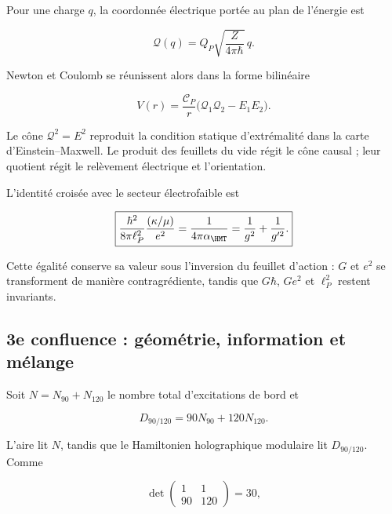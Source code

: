 Pour une charge \(q\), la coordonnée électrique portée au plan de l’énergie est

\begin{equation}
 \mathcal Q(q)=Q_P\sqrt{\frac{Z}{4\pi\hbar}}\,q.
 \label{rm:eq:confluence-electric-coordinate}
\end{equation}

Newton et Coulomb se réunissent alors dans la forme bilinéaire

\begin{equation}
 \boxed{
 V(r)=\frac{\mathscr C_P}{r}
 \bigl(\mathcal Q_1\mathcal Q_2-E_1E_2\bigr).}
 \label{rm:eq:confluence-newton-coulomb}
\end{equation}

Le cône \(\mathcal Q^2=E^2\) reproduit la condition statique d’extrémalité dans la carte d’Einstein--Maxwell. Le produit des feuillets du vide régit le cône causal ; leur quotient régit le relèvement électrique et l’orientation.

L’identité croisée avec le secteur électrofaible est

\begin{equation}
 \boxed{
 \frac{\hbar^2}{8\pi\ell_P^2}
 \frac{(\kappa/\mu)}{e^2}
 =\frac1{4\pi\alpha_{\HMT}}
 =\frac1{g^2}+\frac1{g'^2}.}
 \label{rm:eq:confluence-einstein-maxwell-ew}
\end{equation}

Cette égalité conserve sa valeur sous l’inversion du feuillet d’action : \(G\) et \(e^2\) se transforment de manière contragrédiente, tandis que \(G\hbar\), \(Ge^2\) et \(\ell_P^2\) restent invariants.

\subsection{3e confluence : géométrie, information et mélange}

Soit \(N=N_{90}+N_{120}\) le nombre total d’excitations de bord et

\begin{equation}
 D_{90/120}=90N_{90}+120N_{120}.
 \label{rm:eq:confluence-modular-provenance}
\end{equation}

L’aire lit \(N\), tandis que le Hamiltonien holographique modulaire lit \(D_{90/120}\). Comme

\begin{equation}
 \det\begin{pmatrix}1&1\\90&120\end{pmatrix}=30,
 \label{rm:eq:confluence-modular-determinant}
\end{equation}

